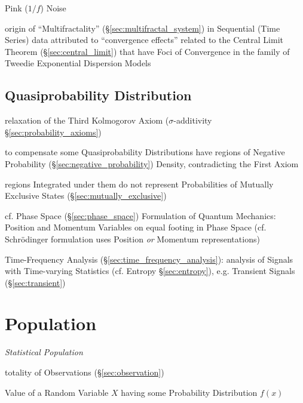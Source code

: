 Pink ($1/f$) Noise

\fist origin of ``Multifractality'' (\S\ref{sec:multifractal_system}) in
Sequential (Time Series) data attributed to ``convergence effects'' related to
the Central Limit Theorem (\S\ref{sec:central_limit}) that have Foci of
Convergence in the family of Tweedie Exponential Dispersion Models



\subsection{Quasiprobability Distribution}
\label{sec:quasiprobability_distribution}

relaxation of the Third Kolmogorov Axiom ($\sigma$-additivity
\S\ref{sec:probability_axioms})

to compensate some Quasiprobability Distributions have regions of Negative
Probability (\S\ref{sec:negative_probability}) Density, contradicting the First
Axiom

regions Integrated under them do not represent Probabilities of Mutually
Exclusive States (\S\ref{sec:mutually_exclusive})

cf. Phase Space (\S\ref{sec:phase_space}) Formulation of Quantum Mechanics:
Position and Momentum Variables on equal footing in Phase Space (cf.
Schr\"odinger formulation uses Position \emph{or} Momentum representations)

\fist Time-Frequency Analysis (\S\ref{sec:time_frequency_analysis}): analysis
of Signals with Time-varying Statistics (cf. Entropy \S\ref{sec:entropy}), e.g.
Transient Signals (\S\ref{sec:transient})



\section{Population}\label{sec:population}

\emph{Statistical Population}

totality of Observations (\S\ref{sec:observation})

Value of a Random Variable $X$ having some Probability
Distribution $f(x)$

